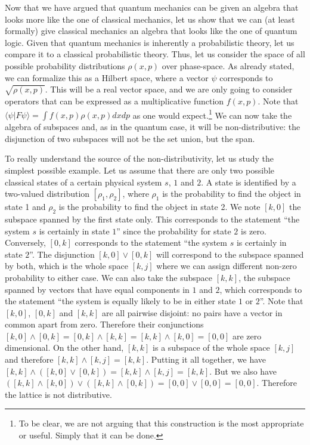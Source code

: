\documentclass[11pt, executivepaper]{article}
\begin{document}
Now that we have argued that quantum mechanics can be given an algebra that looks more like the one of classical mechanics, let us show that we can (at least formally) give classical mechanics an algebra that looks like the one of quantum logic. Given that quantum mechanics is inherently a probabilistic theory, let us compare it to a classical probabilistic theory. Thus, let us consider the space of all possible probability distributions $\rho(x,p)$ over phase-space. As already stated, we can formalize this as a Hilbert space, where a vector $\psi$ corresponds to $\sqrt{\rho(x,p)}$. This will be a real vector space, and we are only going to consider operators that can be expressed as a multiplicative function $f(x,p)$. Note that $\langle \psi | F \psi \rangle = \int f(x,p) \rho(x,p) dx dp$ as one would expect.\footnote{To be clear, we are not arguing that this construction is the most appropriate or useful. Simply that it can be done.}  We can now take the algebra of subspaces and, as in the quantum case, it will be non-distributive: the disjunction of two subspaces will not be the set union, but the span.

To really understand the source of the non-distributivity, let us study the simplest possible example. Let us assume that there are only two possible classical states of a certain physical system $s$, $1$ and $2$. A state is identified by a two-valued distribution $[\rho_1, \rho_2]$, where $\rho_1$ is the probability to find the object in state 1 and $\rho_2$ is the probability to find the object in state 2. We note $[k,0]$ the subspace spanned by the first state only. This corresponds to the statement ``the system $s$ is certainly in state $1$'' since the probability for state $2$ is zero. Conversely, $[0,k]$ corresponds to the statement ``the system $s$ is certainly in state $2$''. The disjunction $[k,0] \vee [0,k]$ will correspond to the subspace spanned by both, which is the whole space $[k,j]$ where we can assign different non-zero probability to either case. We can also take the subspace $[k,k]$, the subspace spanned by vectors that have equal components in $1$ and $2$, which corresponds to the statement ``the system is equally likely to be in either state $1$ or $2$''. Note that $[k,0]$, $[0,k]$ and $[k,k]$ are all pairwise disjoint: no pairs have a vector in common apart from zero. Therefore their conjunctions $[k,0] \wedge [0,k] = [0,k] \wedge [k,k] = [k,k] \wedge [k,0] = [0,0]$ are zero dimensional. On the other hand, $[k,k]$ is a subspace of the whole space $[k,j]$ and therefore $[k,k] \wedge [k,j] = [k,k]$. Putting it all together, we have $[k,k] \wedge ( [k,0] \vee [0,k] ) = [k,k] \wedge [k,j] = [k,k]$. But we also have $( [k,k] \wedge [k,0] ) \vee ( [k,k] \wedge [0,k] ) = [0,0] \vee [0,0] = [0,0]$. Therefore the lattice is not distributive.
\end{document}
